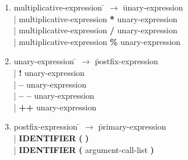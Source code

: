 \begin{enumerate}
\item \begin{tabbing} multiplicative-expression \= $\rightarrow$ \= unary-expression \\
	\> \hspace*{0.05cm} | \> multiplicative-expression \textbf{*}   unary-expression \\
	\> \hspace*{0.05cm} | \> multiplicative-expression \textbf{/}   unary-expression \\
	\> \hspace*{0.05cm} | \> multiplicative-expression \textbf{\%}  unary-expression \\
\end{tabbing}

\item \begin{tabbing} unary-expression \= $\rightarrow$ \= postfix-expression \\
	\> \hspace*{0.05cm} | \>  \textbf{!}   unary-expression \\
	\> \hspace*{0.05cm} | \>  \textbf{--}   unary-expression \\
	\> \hspace*{0.05cm} | \>  \textbf{-- --}  unary-expression \\
	\> \hspace*{0.05cm} | \>  \textbf{++}  unary-expression \\
\end{tabbing}

\item \begin{tabbing} postfix-expression \= $\rightarrow$ \= primary-expression \\
	\> \hspace*{0.05cm} | \> \textbf{IDENTIFIER} \textbf{(} \textbf{)} \\
	\> \hspace*{0.05cm} | \> \textbf{IDENTIFIER} \textbf{(} argument-call-list \textbf{)} \\
\end{tabbing}


\end{enumerate}
